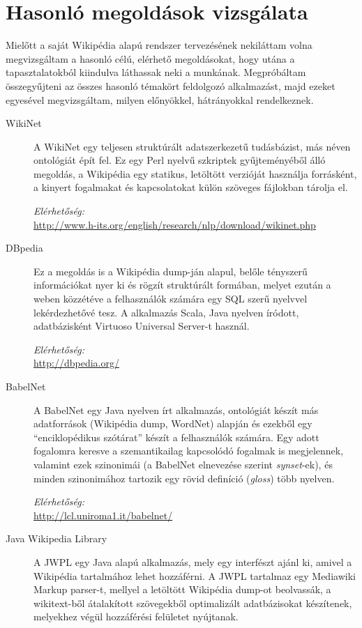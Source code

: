 \chapter{Hasonló megoldások vizsgálata}
\label{cha:related_work}

Mielőtt a saját Wikipédia alapú rendszer tervezésének nekiláttam volna megvizsgáltam a hasonló célú, elérhető megoldásokat, hogy utána a tapasztalatokból kiindulva láthassak neki a munkának. Megpróbáltam összegyűjteni az összes hasonló témakört feldolgozó alkalmazást, majd ezeket egyesével megvizsgáltam, milyen előnyökkel, hátrányokkal rendelkeznek.

\begin{description}
	\item[WikiNet \cite{wikinet}] A WikiNet egy teljesen struktúrált adatszerkezetű tudásbázist, más néven ontológiát épít fel. Ez egy Perl nyelvű szkriptek gyűjteményéből álló megoldás, a Wikipédia egy statikus, letöltött verzióját használja forrásként, a kinyert fogalmakat és kapcsolatokat külön szöveges fájlokban tárolja el.
	
\textit{Elérhetőség:}\\
\url{http://www.h-its.org/english/research/nlp/download/wikinet.php}

	\item[DBpedia] Ez a megoldás is a Wikipédia dump-ján alapul, belőle tényszerű információkat nyer ki és rögzít struktúrált formában, melyet ezután a weben közzétéve a felhasználók számára egy SQL szerű nyelvvel lekérdezhetővé tesz. A alkalmazás Scala, Java nyelven íródott, adatbázisként Virtuoso Universal Server-t használ.
	
\textit{Elérhetőség:}\\
\url{http://dbpedia.org/}

\item[BabelNet \cite{babelnet}] A BabelNet egy Java nyelven írt alkalmazás, ontológiát készít más adatforrások (Wikipédia dump, WordNet) alapján és ezekből egy ``enciklopédikus szótárat'' készít a felhasználók számára. Egy adott fogalomra keresve a szemantikailag kapcsolódó fogalmak is megjelennek, valamint ezek szinonimái (a BabelNet elnevezése szerint \textit{synset}-ek), és minden szinonimához tartozik egy rövid definíció (\textit{gloss}) több nyelven.
	
\textit{Elérhetőség:}\\
\url{http://lcl.uniroma1.it/babelnet/}

\item[Java Wikipedia Library \cite{jwpl}] A JWPL egy Java alapú alkalmazás, mely egy interfészt ajánl ki, amivel a Wikipédia tartalmához lehet hozzáférni. A JWPL tartalmaz egy Mediawiki Markup parser-t, mellyel a letöltött Wikipédia dump-ot beolvassák, a wikitext-ből átalakított szövegekből optimalizált adatbázisokat készítenek, melyekhez végül hozzáférési felületet nyújtanak.
	

\end{description}

